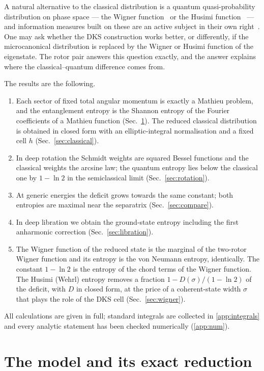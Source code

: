 \documentclass[preprint,12pt]{elsarticle}
\begin{document}
A natural alternative to the classical distribution is a quantum
quasi-probability distribution on phase space --- the Wigner
function~\cite{Hillery} or the Husimi function~\cite{Husimi} --- and
information measures built on these are an active subject in their own
right~\cite{Wehrl,PSinfo1,PSinfo2}. One may ask whether the DKS construction
works better, or differently, if the microcanonical distribution is replaced by
the Wigner or Husimi function of the eigenstate. The rotor pair answers this
question exactly, and the answer explains where the classical--quantum
difference comes from.

The results are the following.
\begin{enumerate}
\item Each sector of fixed total angular momentum is exactly a Mathieu problem,
and the entanglement entropy is the Shannon entropy of the Fourier
coefficients of a Mathieu function (Sec.~\ref{sec:model}). The reduced
classical distribution is obtained in closed form with an elliptic-integral
normalisation and a fixed cell $h$ (Sec.~\ref{sec:classical}).
\item In deep rotation the Schmidt weights are squared Bessel functions and the
classical weights the arcsine law; the quantum entropy lies below the
classical one by $1-\ln2$ in the semiclassical limit
(Sec.~\ref{sec:rotation}).
\item At generic energies the deficit grows towards the same constant; both
entropies are maximal near the separatrix (Sec.~\ref{sec:compare}).
\item In deep libration we obtain the ground-state entropy including the first
anharmonic correction (Sec.~\ref{sec:libration}).
\item The Wigner function of the reduced state is the marginal of the
two-rotor Wigner function and its entropy is the von Neumann entropy,
identically. The constant $1-\ln2$ is the entropy of the chord terms of the
Wigner function. The Husimi (Wehrl) entropy removes a fraction
$1-D(\sigma)/(1-\ln2)$ of the deficit, with $D$ in closed form, at the price of a
coherent-state width $\sigma$ that plays the role of the DKS cell
(Sec.~\ref{sec:wigner}).
\end{enumerate}
All calculations are given in full; standard integrals are collected in
\ref{app:integrals} and every analytic statement has been checked numerically
(\ref{app:num}).

\section{The model and its exact reduction}
\label{sec:model}
\end{document}
